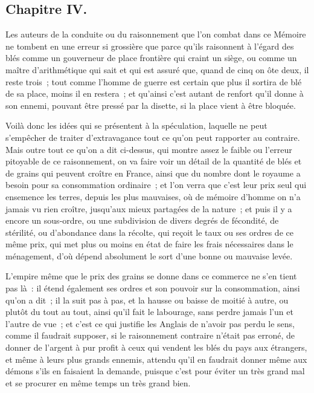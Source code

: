 \documentclass[french,twoside]{book} %
\begin{document}
\subsection[{Chapitre IV.}]{Chapitre IV.}
\noindent Les auteurs de la conduite ou du raisonnement que l’on combat dans ce Mémoire ne tombent en une erreur si grossière que parce qu’ils raisonnent à l’égard des blés comme un gouverneur de place frontière qui craint un siège, ou comme un maître d’arithmétique qui sait et qui est assuré que, quand de cinq on ôte deux, il reste trois ; tout comme l’homme de guerre est certain que plus il sortira de blé de sa place, moins il en restera ; et qu’ainsi c’est autant de renfort qu’il donne à son ennemi, pouvant être pressé par la disette, si la place vient à être bloquée.\par
Voilà donc les idées qui se présentent à la spéculation, laquelle ne peut s’empêcher de traiter d’extravagance tout ce qu’on peut rapporter au contraire. Mais outre tout ce qu’on a dit ci-dessus, qui montre assez le faible ou l’erreur pitoyable de ce raisonnement, on va faire voir un détail de la quantité de blés et de grains qui peuvent croître en France, ainsi que du nombre dont le royaume a besoin pour sa consommation ordinaire ; et l’on verra que c’est leur prix seul qui ensemence les terres, depuis les plus mauvaises, où de mémoire d’homme on n’a jamais vu rien croître, jusqu’aux mieux partagées de la nature ; et puis il y a encore un sous-ordre, ou une subdivision de divers degrés de fécondité, de stérilité, ou d’abondance dans la récolte, qui reçoit le taux ou ses ordres de ce même prix, qui met plus ou moins en état de faire les frais nécessaires dans le ménagement, d’où dépend absolument le sort d’une bonne ou mauvaise levée.\par
L’empire même que le prix des grains se donne dans ce commerce ne s’en tient pas là : il étend également ses ordres et son pouvoir sur la consommation, ainsi qu’on a dit ; il la suit pas à pas, et la hausse ou baisse de moitié à autre, ou plutôt du tout au tout, ainsi qu’il fait le labourage, sans perdre jamais l’un et l’autre de vue ; et c’est ce qui justifie les Anglais de n’avoir pas perdu le sens, comme il faudrait supposer, si le raisonnement contraire n’était pas erroné, de donner de l’argent à pur profit à ceux qui vendent les blés du pays aux étrangers, et même à leurs plus grands ennemis, attendu qu’il en faudrait donner même aux démons s’ils en faisaient la demande, puisque c’est pour éviter un très grand mal et se procurer en même temps un très grand bien.\par
\end{document}
